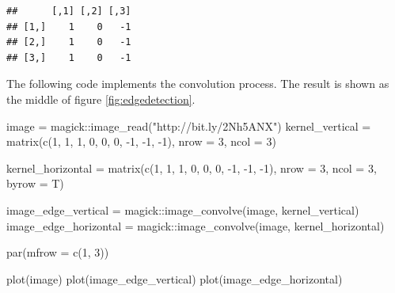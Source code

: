 \documentclass[
  12pt,
]{krantz}
\makeatletter
\newenvironment{Shaded}{\begin{snugshade}}{\end{snugshade}}
\newcommand{\AttributeTok}[1]{\textcolor[rgb]{0.61,0.61,0.61}{#1}}
\newcommand{\DecValTok}[1]{\textcolor[rgb]{0.06,0.06,0.06}{#1}}
\newcommand{\FunctionTok}[1]{\textcolor[rgb]{0,0,0}{#1}}
\newcommand{\NormalTok}[1]{#1}
\newcommand{\OtherTok}[1]{\textcolor[rgb]{0.37,0.37,0.37}{#1}}
\newcommand{\SpecialCharTok}[1]{\textcolor[rgb]{0,0,0}{#1}}
\newcommand{\StringTok}[1]{\textcolor[rgb]{0.5,0.5,0.5}{#1}}
\newenvironment{kframe}{%
\medskip{}
\setlength{\fboxsep}{.8em}
 \def\at@end@of@kframe{}%
 \ifinner\ifhmode%
  \def\at@end@of@kframe{\end{minipage}}%
  \begin{minipage}{\columnwidth}%
 \fi\fi%
 \def\FrameCommand##1{\hskip\@totalleftmargin \hskip-\fboxsep
 \colorbox{shadecolor}{##1}\hskip-\fboxsep
     \hskip-\linewidth \hskip-\@totalleftmargin \hskip\columnwidth}%
 \MakeFramed {\advance\hsize-\width
   \@totalleftmargin\z@ \linewidth\hsize
   \@setminipage}}%
 {\par\unskip\endMakeFramed%
 \at@end@of@kframe}
\renewenvironment{Shaded}{\begin{kframe}}{\end{kframe}}
\makeatother
\begin{document}
\begin{verbatim}
##      [,1] [,2] [,3]
## [1,]    1    0   -1
## [2,]    1    0   -1
## [3,]    1    0   -1
\end{verbatim}

The following code implements the convolution process. The result is shown as the middle of figure \ref{fig:edgedetection}.

\begin{Shaded}
\begin{Highlighting}[]
\NormalTok{image }\OtherTok{=}\NormalTok{ magick}\SpecialCharTok{::}\FunctionTok{image\_read}\NormalTok{(}\StringTok{"http://bit.ly/2Nh5ANX"}\NormalTok{)}
\NormalTok{kernel\_vertical }\OtherTok{=} \FunctionTok{matrix}\NormalTok{(}\FunctionTok{c}\NormalTok{(}\DecValTok{1}\NormalTok{, }\DecValTok{1}\NormalTok{, }\DecValTok{1}\NormalTok{, }\DecValTok{0}\NormalTok{, }\DecValTok{0}\NormalTok{, }\DecValTok{0}\NormalTok{, }\SpecialCharTok{{-}}\DecValTok{1}\NormalTok{, }\SpecialCharTok{{-}}\DecValTok{1}\NormalTok{, }\SpecialCharTok{{-}}\DecValTok{1}\NormalTok{), }
                       \AttributeTok{nrow =} \DecValTok{3}\NormalTok{, }\AttributeTok{ncol =} \DecValTok{3}\NormalTok{)}

\NormalTok{kernel\_horizontal }\OtherTok{=} \FunctionTok{matrix}\NormalTok{(}\FunctionTok{c}\NormalTok{(}\DecValTok{1}\NormalTok{, }\DecValTok{1}\NormalTok{, }\DecValTok{1}\NormalTok{, }\DecValTok{0}\NormalTok{, }\DecValTok{0}\NormalTok{, }\DecValTok{0}\NormalTok{, }\SpecialCharTok{{-}}\DecValTok{1}\NormalTok{, }\SpecialCharTok{{-}}\DecValTok{1}\NormalTok{, }\SpecialCharTok{{-}}\DecValTok{1}\NormalTok{), }
                       \AttributeTok{nrow =} \DecValTok{3}\NormalTok{, }\AttributeTok{ncol =} \DecValTok{3}\NormalTok{, }\AttributeTok{byrow =}\NormalTok{ T)}

\NormalTok{image\_edge\_vertical }\OtherTok{=}\NormalTok{ magick}\SpecialCharTok{::}\FunctionTok{image\_convolve}\NormalTok{(image, kernel\_vertical)}
\NormalTok{image\_edge\_horizontal }\OtherTok{=}\NormalTok{ magick}\SpecialCharTok{::}\FunctionTok{image\_convolve}\NormalTok{(image, kernel\_horizontal)}

\FunctionTok{par}\NormalTok{(}\AttributeTok{mfrow =} \FunctionTok{c}\NormalTok{(}\DecValTok{1}\NormalTok{, }\DecValTok{3}\NormalTok{))}

\FunctionTok{plot}\NormalTok{(image)}
\FunctionTok{plot}\NormalTok{(image\_edge\_vertical)}
\FunctionTok{plot}\NormalTok{(image\_edge\_horizontal)}
\end{Highlighting}
\end{Shaded}
\end{document}
